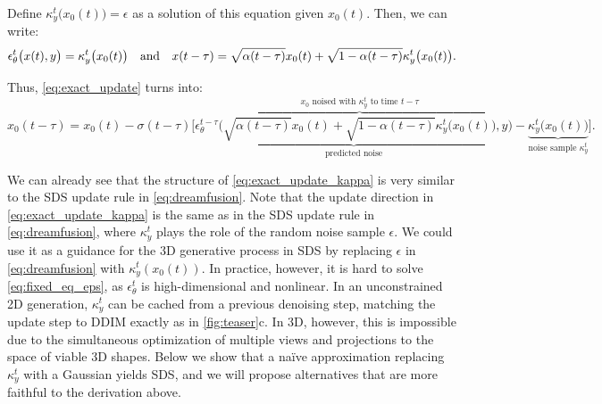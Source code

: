 Define $\kappa^t_y\bigl(x_0(t)\bigr) = \epsilon$ as a solution of 
this equation given $x_0(t)$. Then, we can write:
\begin{equation}
    \label{eq:kappa_deriv}
        \epsilon_\theta^{t} \bigl( x(t), y\bigr) = \kappa^{t}_y\bigl(x_0(t) \bigr)%
        \textrm{\quad and\quad}
        x(t - \tau) = \sqrt{\alpha(t - \tau)} x_0(t) + \sqrt{1 - \alpha(t - \tau)} \kappa^{t}_y\bigl(x_0(t)\bigr) \text{.}
\end{equation}

Thus, \cref{eq:exact_update} turns into:
\begin{equation}
    \label{eq:exact_update_kappa}
    x_0(t \!-\! \tau) =  x_0(t) \!-\! \sigma(t \!-\! \tau) \bigl[  
                 \underbrace{
                    \epsilon_\theta^{t - \tau} \bigl( 
                        \overbrace{
                            \sqrt{\alpha(t \!-\! \tau)} x_0(t) \!+\! \sqrt{1 \!-\! \alpha(t \!-\! \tau)} \kappa^{t}_y\bigl(x_0(t)\bigr)
                        }^{\text{$x_0$ noised with $\kappa^t_y$ to time $t - \tau$}}
                        , y
                    \bigr)
                }_{\text{predicted noise}}
               \!-\! 
               \underbrace{
                \kappa^{t}_y\bigl(x_0(t)\bigr)
               }_{\text{noise sample $\kappa^t_y$}}\!\!\!
            \bigr]\! \text{.}
\end{equation}

We can already see that the structure of \cref{eq:exact_update_kappa} is very similar to the SDS update rule in \cref{eq:dreamfusion}.
Note that the update direction in \cref{eq:exact_update_kappa} is the same as in the SDS update rule in \cref{eq:dreamfusion}, where $\kappa^t_y$ plays the role of the random noise sample $\epsilon$. 
We could use it as a guidance for the 3D generative process in SDS by replacing $\epsilon$ in \cref{eq:dreamfusion} with $\kappa^t_y(x_0(t)).$ 
In practice, however, it is hard to solve \cref{eq:fixed_eq_eps},  as $\epsilon_\theta^{t}$ is high-dimensional and nonlinear.
%
In an unconstrained 2D generation, $\kappa^t_y$ can be cached from a previous denoising step, matching the update step to DDIM exactly as in \cref{fig:teaser}c.
%
In 3D, however, this is impossible due to the simultaneous optimization of multiple views and projections to the space of viable 3D shapes.
%
Below we show that a na\"ive approximation replacing $\kappa^t_y$ with a Gaussian yields SDS, and we will propose alternatives that are more faithful to the derivation above. 


